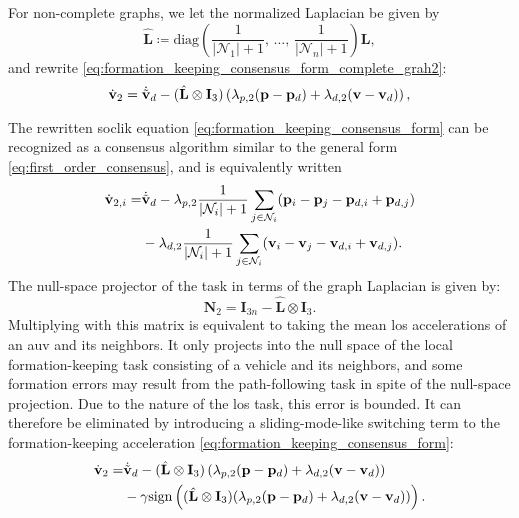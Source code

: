 For non-complete graphs, we let the normalized Laplacian be given by
\begin{equation}
    \hat{\mathbf{L}} \coloneqq \mathrm{diag}\left(\frac{1}{|\mathcal{N}_1|+1},\, \ldots, \,\frac{1}{|\mathcal{N}_n|+1}\right) \mathbf{L},
\end{equation}
and rewrite \eqref{eq:formation_keeping_consensus_form_complete_grah2}:
\begin{equation}\label{eq:formation_keeping_consensus_form}
    \dot{\mathbf{v}}_2 = \dot{\Tilde{\mathbf{v}}}_{d}
 - (\hat{\mathbf{L}}\otimes \mathbf{I}_3)\left(\lambda_{p,2}(\mathbf{p}-\mathbf{p}_d) + \lambda_{d,2}(\mathbf{v} - \mathbf{v}_d)\right),
\end{equation}

The rewritten \gls{soclik} equation \eqref{eq:formation_keeping_consensus_form} can be recognized as a consensus algorithm similar to the general form \eqref{eq:first_order_consensus}, and is equivalently written
\begin{equation}
\begin{split}
     \dot{\mathbf{v}}_{2,i} = 
     &\dot{\Tilde{\mathbf{v}}}_{d}
     - \lambda_{p,2}\frac{1}{|\mathcal{N}_i|+1}\sum_{j\in \mathcal{N}_i}(\mathbf{p}_i - \mathbf{p}_j-\mathbf{p}_{d,i} + \mathbf{p}_{d,j})\\
     &- \lambda_{d,2}\frac{1}{|\mathcal{N}_i|+1}\sum_{j\in \mathcal{N}_i}(\mathbf{v}_i-\mathbf{v}_j - \mathbf{v}_{d,i} + \mathbf{v}_{d,j}).
 \end{split}
\end{equation}
The null-space projector of the task in terms of the graph Laplacian is given by:
\begin{equation}\label{eq:distributed_formation_null_space}
    \mathbf{N}_2 = \mathbf{I}_{3n} - \hat{\mathbf{L}}\otimes \mathbf{I}_3. 
\end{equation}
Multiplying with this matrix is equivalent to taking the mean \gls{los} accelerations of an \gls{auv} and its neighbors. It only projects into the null space of the local formation-keeping task consisting of a vehicle and its neighbors, and some formation errors may result from the path-following task in spite of the null-space projection. Due to the nature of the \gls{los} task, this error is bounded. It can therefore be eliminated by introducing a sliding-mode-like switching term to the formation-keeping acceleration \eqref{eq:formation_keeping_consensus_form}:
\begin{equation}
\begin{split}
     \dot{\mathbf{v}}_2 = &\dot{\Tilde{\mathbf{v}}}_{d} -(\hat{\mathbf{L}}\otimes \mathbf{I}_3)\left(\lambda_{p,2}(\mathbf{p}-\mathbf{p}_d) + \lambda_{d,2}(\mathbf{v} - \mathbf{v}_d)\right) \\
     &-\gamma \mathrm{sign}\left((\hat{\mathbf{L}}\otimes \mathbf{I}_3)(\lambda_{p,2}(\mathbf{p}-\mathbf{p}_d) + \lambda_{d,2}(\mathbf{v} - \mathbf{v}_d))\right).
\end{split}
\end{equation}
